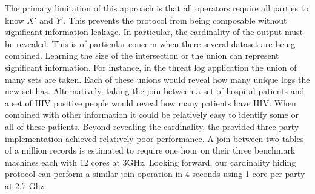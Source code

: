 \begin{itemize}
The primary limitation of this approach is that all operators require all parties to know $X'$ and $Y'$. This prevents the protocol from being composable without significant information leakage. In particular, the cardinality of the output must be revealed. This is of particular concern when there several dataset are being combined. Learning the size of the intersection or the union can represent significant information. For instance, in the threat log application the union of many sets are taken. Each of these unions would reveal how many unique logs the new set has. Alternatively, taking the join between a set of hospital patients and a set of HIV positive people would reveal how many patients have HIV. When combined with other information it could be relatively easy to identify some or all of these patients. Beyond revealing the cardinality, the provided three party implementation achieved relatively poor performance. A join between two tables of a million records is estimated to require one hour on their three benchmark machines each with 12 cores at 3GHz\cite{LTW13}. Looking forward, our cardinality hiding protocol can perform a similar join operation in 4 seconds using 1 core per party at 2.7 Ghz. 


\end{itemize}